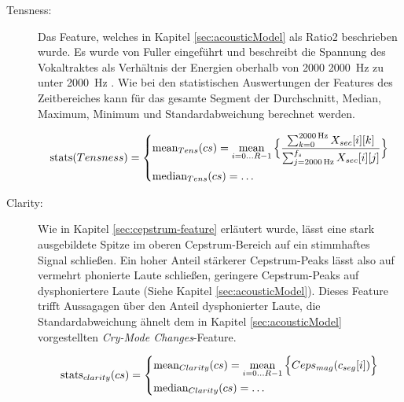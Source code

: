 \begin{description}
\item[Tensness:] Das Feature, welches in Kapitel \ref{sec:acousticModel} als \glqq Ratio2\grqq{} beschrieben wurde. Es wurde von Fuller \cite{threeCryTypes} eingeführt und beschreibt die Spannung des Vokaltraktes als Verhältnis der Energien oberhalb von 2000 \SI{2000}{\hertz} zu unter \SI{2000}{\hertz} . Wie bei den statistischen Auswertungen der Features des Zeitbereiches kann für das gesamte Segment der Durchschnitt, Median, Maximum, Minimum und Standardabweichung berechnet werden.

\begin{equation}
\text{stats}(Tensness) = 
\begin{dcases}
\text{mean}_{Tens}(cs) = \operatorname*{mean}_{i=0\ldots R-1} \Big\{ \frac{\sum_{k=0}^{\SI{2000}{\hertz}} X_{sec}[i][k]}{\sum_{j=\SI{2000}{\hertz}}^{f_{s}} X_{sec}[i][j]} \Big\} \\
\text{median}_{Tens}(cs) = \ldots
\end{dcases}
\end{equation}

\item[Clarity: ] Wie in Kapitel \ref{sec:cepstrum-feature} erläutert wurde, lässt eine stark ausgebildete Spitze im oberen Cepstrum-Bereich auf ein stimmhaftes Signal schließen. Ein hoher Anteil stärkerer Cepstrum-Peaks lässt also auf vermehrt phonierte Laute schließen, geringere Cepstrum-Peaks auf dysphoniertere Laute (Siehe Kapitel \ref{sec:acousticModel}). Dieses Feature trifft Aussagagen über den Anteil dysphonierter Laute, die Standardabweichung ähnelt dem in Kapitel \ref{sec:acousticModel} vorgestellten \emph{Cry-Mode Changes}-Feature.

\begin{equation}
\text{stats}_{clarity}(cs) = 
\begin{dcases}
\text{mean}_{Clarity}(cs) = \operatorname*{mean}_{i=0\ldots R-1} \Big\{ Ceps_{mag}(c_{seg}[i])  \Big\} \\
\text{median}_{Clarity}(cs) = \ldots
\end{dcases}
\end{equation}
	
	
\end{description}

